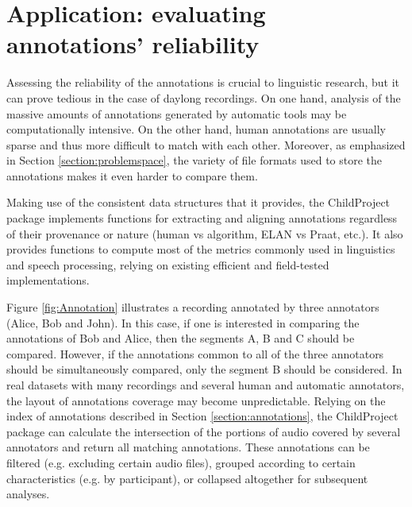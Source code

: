 \documentclass[smallextended]{svjour3}       %
\begin{document}
\section{Application: evaluating annotations' reliability}


Assessing the reliability of the annotations is crucial to linguistic research, but it can prove tedious in the case of daylong recordings. On one hand, analysis of the massive amounts of annotations generated by automatic tools may be computationally intensive. On the other hand, human annotations are usually sparse and thus more difficult to match with each other. Moreover, as emphasized in Section \ref{section:problemspace}, the variety of file formats used to store the annotations makes it even harder to compare them.

Making use of the consistent data structures that it provides, the ChildProject package implements functions for extracting and aligning annotations regardless of their provenance or nature (human vs algorithm, ELAN vs Praat, etc.). It also provides functions to compute most of the metrics commonly used in linguistics and speech processing, relying on existing efficient and field-tested implementations.

Figure \ref{fig:Annotation} illustrates a recording annotated by three annotators (Alice, Bob and John). In this case, if one is interested in comparing the annotations of Bob and Alice, then the segments A, B and C should be compared. However, if the annotations common to all of the three annotators should be simultaneously compared, only the segment B should be considered.
In real datasets with many recordings and several human and automatic annotators, the layout of annotations coverage may become unpredictable. Relying on the index of annotations described in Section \ref{section:annotations}, the ChildProject package can calculate the intersection of the portions of audio covered by several annotators and return all matching annotations. These annotations can be filtered (e.g. excluding certain audio files), grouped according to certain characteristics (e.g. by participant), or collapsed altogether for subsequent analyses.
\end{document}
